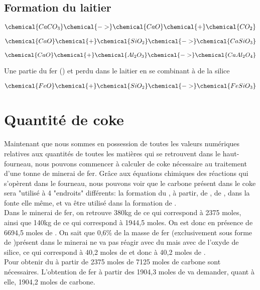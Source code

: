 \documentclass[11pt,a4paper]{report}
\begin{document}
\subsection{Formation du laitier}
\begin{center}
\[
\chemical{CaCO_3}
\chemical{->}
\chemical{CaO}\chemical{+}\chemical{CO_2}
\]

\[
\chemical{CaO}\chemical{+}\chemical{SiO_2}
\chemical{->}
\chemical{CaSiO_3}
\]

\[
\chemical{CaO}\chemical{+}\chemical{Al_2O_3}
\chemical{->}
\chemical{CaAl_2O_4}
\]

Une partie du fer () et perdu dans le laitier en se combinant à de la silice

\[
\chemical{FeO}\chemical{+}\chemical{SiO_2}
\chemical{->}
\chemical{FeSiO_3}
\]
\end{center}

\section{Quantité de coke}

Maintenant que nous sommes en possession de toutes les valeurs numériques relatives aux quantités de toutes les matières qui se retrouvent dans le haut-fourneau, nous pouvons commencer à calculer de coke nécessaire au traitement d'une tonne de minerai de fer. Grâce aux équations chimiques des réactions qui s'opèrent dans le fourneau, nous pouvons voir que le carbone présent dans le coke sera "utilisé à 4 "endroits" différents: la formation du , à partir, de , de , dans la fonte elle même, et va être utilisé dans la formation de \chemical{+}.\\

Dans le minerai de fer, on retrouve 380kg de  ce qui correspond à 2375 moles, ainsi que 140kg de  ce qui correspond à 1944,5 moles. On est donc en présence de 6694,5 moles de . On sait que 0,6\% de la masse de fer (exclusivement sous forme de )présent dans le minerai ne va pas réagir avec du  mais avec de l'oxyde de silice, ce qui correspond à 40,2 moles de  et donc à 40,2 moles de .\\

Pour obtenir du  à partir de 2375 moles de  7125 moles de carbone sont nécessaires. L'obtention de fer à partir des 1904,3 moles de  va demander, quant à elle, 1904,2 moles de carbone.\\
\end{document}
